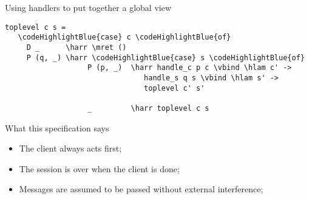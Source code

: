 \documentclass{beamer}
\newcommand\codeHighlightBlue[1]{\textcolor[rgb]{0,0,1}{\textbf{#1}}}
\newcommand\codeHighlightGreen[1]{\textcolor[rgb]{0.1,0.7,0.1}{\textbf{#1}}}
\newcommand\codeHighlightOrange[1]{\textcolor[rgb]{0.9, 0.3, 0}{\textbf{#1}}}
\newcommand\vbind[0]{\codeHighlightGreen{>>=}}
\newcommand\mret[0]{\codeHighlightGreen{return}}
\newcommand\hlam[0]{\ensuremath{\backslash}}
\newcommand\harr[0]{\codeHighlightOrange{->}}
\begin{document}
\begin{frame}[fragile]{Using handlers to put together a global view}
 
\begin{small}
\begin{Verbatim}[commandchars=\\\{\}]
 toplevel c s =
   \codeHighlightBlue{case} c \codeHighlightBlue{of}
     D _      \harr \mret ()
     P (q, _) \harr \codeHighlightBlue{case} s \codeHighlightBlue{of}
                   P (p, _)  \harr handle_c p c \vbind \hlam c' ->
                                handle_s q s \vbind \hlam s' ->
                                toplevel c' s'

                   _         \harr toplevel c s
\end{Verbatim}
\end{small}

\begin{structure}{What this specification says}
 \begin{itemize}
  \item {The client always acts first;}
  \item {The session is over when the client is done;}
  \item {Messages are assumed to be passed without external interference;}
 \end{itemize}

\end{structure}


\end{frame}
\end{document}
